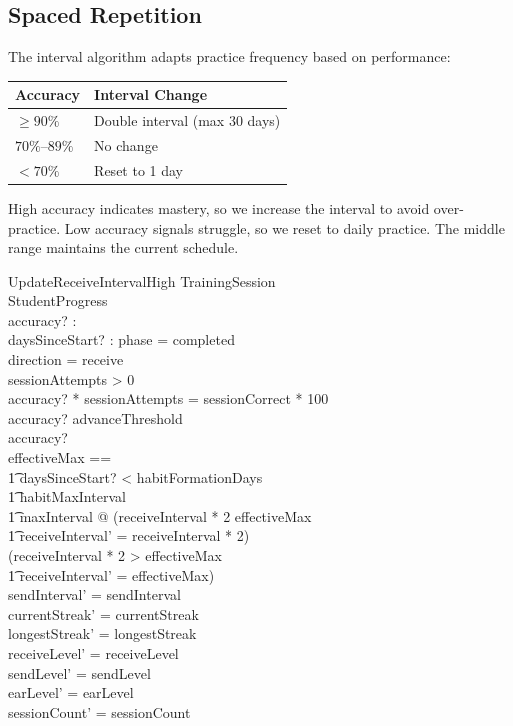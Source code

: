 \documentclass[a4paper,10pt,fleqn]{article}
\begin{document}
\subsection{Spaced Repetition}

The interval algorithm adapts practice frequency based on performance:

\begin{center}
\begin{tabular}{ll}
\hline
Accuracy & Interval Change \\
\hline
$\geq 90\%$ & Double interval (max 30 days) \\
$70\%$--$89\%$ & No change \\
$< 70\%$ & Reset to 1 day \\
\hline
\end{tabular}
\end{center}

High accuracy indicates mastery, so we increase the interval to avoid
over-practice. Low accuracy signals struggle, so we reset to daily practice.
The middle range maintains the current schedule.

\begin{schema}{UpdateReceiveIntervalHigh}
  \Xi TrainingSession \\
  \Delta StudentProgress \\
  accuracy? : \nat \\
  daysSinceStart? : \nat
  \where
  phase = completed \\
  direction = receive \\
  sessionAttempts > 0 \\
  accuracy? * sessionAttempts = sessionCorrect * 100 \\
  accuracy? \geq advanceThreshold \\
  accuracy?  \\
  \LET effectiveMax == \\
  \t1 \IF daysSinceStart? < habitFormationDays \\
  \t1 \THEN habitMaxInterval \\
  \t1 \ELSE maxInterval @
  (receiveInterval * 2 \leq effectiveMax \\
  \t1 \land receiveInterval' = receiveInterval * 2) \\
  \lor (receiveInterval * 2 > effectiveMax \\
  \t1 \land receiveInterval' = effectiveMax) \\
  sendInterval' = sendInterval \\
  currentStreak' = currentStreak \\
  longestStreak' = longestStreak \\
  receiveLevel' = receiveLevel \\
  sendLevel' = sendLevel \\
  earLevel' = earLevel \\
  sessionCount' = sessionCount
\end{schema}
\end{document}
